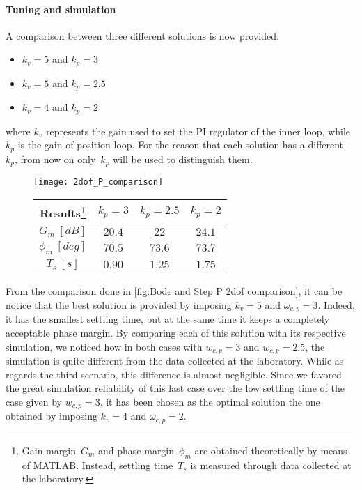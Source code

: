 \paragraph{Tuning and simulation}
A comparison between three different solutions is now provided:
\begin{itemize}
	\item $k_v=5$ and $k_p=3$
	\item $k_v=5$ and $k_p=2.5$
	\item $k_v=4$ and $k_p=2$
\end{itemize}
where $k_v$ represents the gain used to set the PI regulator of the inner loop, while~$k_p$ is the gain of position loop. For the reason that each solution has a different~$k_p$, from now on only~$k_p$ will be used to distinguish them.
\begin{figure*}[h]
	\centering
	\begin{subfigure}{0.4\columnwidth}
		\texttt{[image: 2dof\_P\_comparison]}
		\label{fig:P2dof_step}
	\end{subfigure}
	\begin{subfigure}{0.4\columnwidth}
		\begin{tabular}{|c|ccc|}
			\hline
			Results\footnote{Gain margin~$G_m$ and phase margin~$\phi_m$ are obtained theoretically by means of MATLAB. Instead, settling time~$T_s$ is measured through data collected at the laboratory.} & $k_p=3$ & $k_p=2.5$ & $k_p=2$ \\
			\hline
			$G_m\ [dB]$ & $20.4$ & $22$ & $24.1$ \\
			$\phi_m\ [deg]$ & $70.5$ & $73.6$ & $73.7$ \\
			\hline
			$T_s\ [s]$ & $0.90$ & $1.25$ & $1.75$ \\
			\hline
		\end{tabular}
	\end{subfigure}
	\caption{Comparisons between $k_p=2$, $k_p=2.5$ and $k_p=3$ cases}
	\label{fig:Bode and Step P 2dof comparison}
\end{figure*}

From the comparison done in \cref{fig:Bode and Step P 2dof comparison}, it can be notice that the best solution is provided by imposing $k_v=5$ and  $\omega_{c,p}=3$. Indeed, it has the smallest settling time, but at the same time it keeps a completely acceptable phase margin. By comparing each of this solution with its respective simulation, we noticed how in both cases with $w_{c,p}=3$ and $w_{c,p}=2.5$, the simulation is quite different from the data collected at the laboratory. While as regards the third scenario, this difference is almost negligible. Since we favored the great simulation reliability of this last case over the low settling time of the case given by $w_{c,p}=3$, it has been chosen as the optimal solution the one obtained by imposing $k_v=4$ and $\omega_{c,p}=2$.

